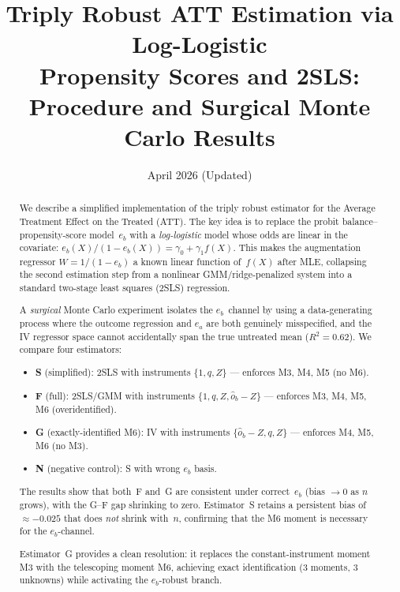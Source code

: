 \documentclass[11pt,letterpaper]{article}
\title{Triply Robust ATT Estimation via Log-Logistic\\Propensity Scores and 2SLS:\\Procedure and Surgical Monte Carlo Results}
\author{}
\date{April 2026 (Updated)}
\begin{document}
\maketitle

\begin{abstract}
We describe a simplified implementation of the triply robust estimator for
the Average Treatment Effect on the Treated (ATT).  The key idea is to
replace the probit balance--propensity-score model~$e_b$ with a
\emph{log-logistic} model whose odds are linear in the covariate:
$e_b(X)/(1-e_b(X)) = \gamma_0 + \gamma_1 f(X)$.  This makes the
augmentation regressor $W = 1/(1-e_b)$ a known linear function of~$f(X)$
after MLE, collapsing the second estimation step from a nonlinear
GMM/ridge-penalized system into a standard two-stage least squares (2SLS)
regression.

A \emph{surgical} Monte Carlo experiment isolates the $e_b$~channel by
using a data-generating process where the outcome regression and $e_a$
are both genuinely misspecified, and the IV regressor space cannot
accidentally span the true untreated mean ($R^2 = 0.62$).  We compare
four estimators:

\begin{itemize}[nosep]
  \item \textbf{S} (simplified): 2SLS with instruments $\{1, q, Z\}$
    --- enforces M3, M4, M5 (no M6).
  \item \textbf{F} (full): 2SLS/GMM with instruments $\{1, q, Z, \hat{o}_b - Z\}$
    --- enforces M3, M4, M5, M6 (overidentified).
  \item \textbf{G} (exactly-identified M6): IV with instruments
    $\{\hat{o}_b - Z, q, Z\}$ --- enforces M4, M5, M6 (no M3).
  \item \textbf{N} (negative control): S with wrong $e_b$ basis.
\end{itemize}

The results show that both~F and~G are consistent under correct~$e_b$
(bias $\to 0$ as $n$ grows), with the G--F gap shrinking to zero.
Estimator~S retains a persistent bias of ${\approx}{-0.025}$ that does
\emph{not} shrink with~$n$, confirming that the M6 moment is
necessary for the $e_b$-channel.

Estimator~G provides a clean resolution: it replaces the
constant-instrument moment M3 with the telescoping moment M6, achieving
exact identification (3 moments, 3 unknowns) while activating the
$e_b$-robust branch.
\end{abstract}
\end{document}

